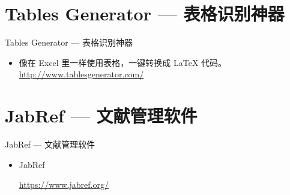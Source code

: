 \documentclass[13pt]{ctexbeamer}
\begin{document}
\section{Tables Generator --- 表格识别神器 }
\begin{frame}{Tables Generator  --- 表格识别神器 }
\begin{itemize}
	\item 	 像在 Excel 里一样使用表格，一键转换成 LaTeX 代码。 
	\href{ http://www.tablesgenerator.com/}{ http://www.tablesgenerator.com/}

\end{itemize}


\end{frame}


\section{JabRef --- 文献管理软件}
\begin{frame}{JabRef  --- 文献管理软件}
\begin{itemize}
\item  JabRef

\href{https://www.jabref.org/}{https://www.jabref.org/}
\end{itemize}
\end{frame} 
\end{document}
